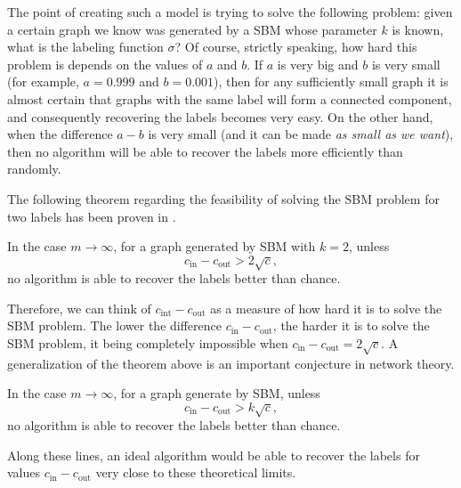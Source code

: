 The point of creating such a model is trying to solve the following problem: given a certain graph we know was generated by a SBM whose parameter $k$ is known, what is the labeling function $\sigma$?
Of course, strictly speaking, how hard this problem is depends on the values of $a$ and $b$. 
If $a$ is very big and $b$ is very small (for example, $a = 0.999$ and $b = 0.001$), then for any sufficiently small graph it is almost certain that graphs with the same label will form a connected component, and consequently recovering the labels becomes very easy.
On the other hand, when the difference $a-b$ is very small (and it can be made \textit{as small as we want}), then no algorithm will be able to recover the labels more efficiently than randomly.

The following theorem regarding the feasibility of solving the SBM problem for two labels has been proven in \cite{ramanujan}. 

\begin{theorem}
In the case $m \rightarrow \infty$, for a graph generated by SBM with $k = 2$, unless
   \begin{equation}
      c_\text{in} - c_\text{out} > 2 \sqrt{c},
   \end{equation}
   no algorithm is able to recover the labels better than chance.
\end{theorem}

Therefore, we can think of $c_\text{int} - c_\text{out}$ as a measure of how hard it is to solve the SBM problem.
The lower the difference $c_\text{in} - c_\text{out}$, the harder it is to solve the SBM problem, it being completely impossible when $c_\text{in} - c_\text{out} = 2 \sqrt{c}$.
A generalization of the theorem above is an important conjecture in network theory.

\begin{conjecture}
In the case $m \rightarrow \infty$, for a graph generate by SBM, unless
   \begin{equation}
      c_\text{in} - c_\text{out} > k \sqrt{c},
   \end{equation}
   no algorithm is able to recover the labels better than chance.
\end{conjecture}

Along these lines, an ideal algorithm would be able to recover the labels for values $c_\text{in} - c_\text{out}$ very close to these theoretical limits.

